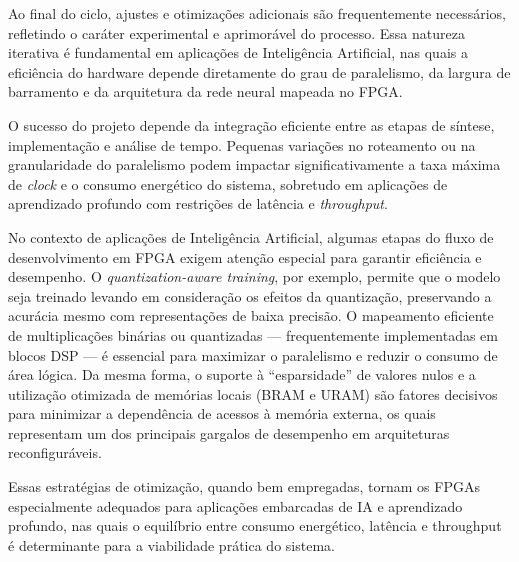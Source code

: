 Ao final do ciclo, ajustes e otimizações adicionais são frequentemente necessários, refletindo o caráter experimental e aprimorável do processo. Essa natureza iterativa é fundamental em aplicações de Inteligência Artificial, nas quais a eficiência do hardware depende diretamente do grau de paralelismo, da largura de barramento e da arquitetura da rede neural mapeada no FPGA.


O sucesso do projeto depende da integração eficiente entre as etapas de síntese, implementação e análise de tempo. Pequenas variações no roteamento ou na granularidade do paralelismo podem impactar significativamente a taxa máxima de \textit{clock} e o consumo energético do sistema, sobretudo em aplicações de aprendizado profundo com restrições de latência e \textit{throughput}.

No contexto de aplicações de Inteligência Artificial, algumas etapas do fluxo de desenvolvimento em FPGA exigem atenção especial para garantir eficiência e desempenho. O \textit{quantization-aware training}, por exemplo, permite que o modelo seja treinado levando em consideração os efeitos da quantização, preservando a acurácia mesmo com representações de baixa precisão. O mapeamento eficiente de multiplicações binárias ou quantizadas — frequentemente implementadas em blocos DSP — é essencial para maximizar o paralelismo e reduzir o consumo de área lógica. Da mesma forma, o suporte à ``esparsidade'' de valores nulos e a utilização otimizada de memórias locais (BRAM e URAM) são fatores decisivos para minimizar a dependência de acessos à memória externa, os quais representam um dos principais gargalos de desempenho em arquiteturas reconfiguráveis.  

Essas estratégias de otimização, quando bem empregadas, tornam os FPGAs especialmente adequados para aplicações embarcadas de IA e aprendizado profundo, nas quais o equilíbrio entre consumo energético, latência e throughput é determinante para a viabilidade prática do sistema.


